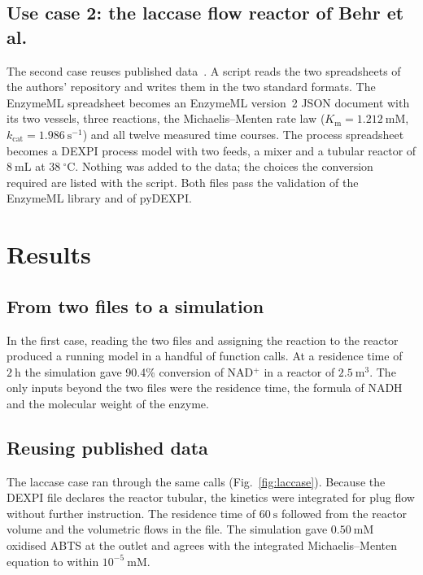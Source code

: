 \documentclass[preprint,12pt]{elsarticle}
\begin{document}
\subsection{Use case 2: the laccase flow reactor of Behr et al.}

The second case reuses published data~\cite{behr2024,behr2024data}. A
script reads the two spreadsheets of the authors' repository and writes
them in the two standard formats. The EnzymeML spreadsheet becomes an
EnzymeML version~2 JSON document with its two vessels, three reactions, the
Michaelis--Menten rate law ($K_\mathrm{m} = 1.212~\mathrm{mM}$,
$k_\mathrm{cat} = 1.986~\mathrm{s^{-1}}$) and all twelve measured time
courses. The process spreadsheet becomes a DEXPI process model with two
feeds, a mixer and a tubular reactor of $8~\mathrm{mL}$ at
$38~^{\circ}\mathrm{C}$. Nothing was added to the data; the choices the
conversion required are listed with the script. Both files pass the
validation of the EnzymeML library and of pyDEXPI.

\section{Results}

\subsection{From two files to a simulation}

In the first case, reading the two files and assigning the reaction to the
reactor produced a running model in a handful of function calls. At a
residence time of $2~\mathrm{h}$ the simulation gave 90.4\% conversion of
NAD$^+$ in a reactor of $2.5~\mathrm{m^3}$. The only inputs beyond the two
files were the residence time, the formula of NADH and the molecular
weight of the enzyme.

\subsection{Reusing published data}

The laccase case ran through the same calls (Fig.~\ref{fig:laccase}).
Because the DEXPI file declares the reactor tubular, the kinetics were
integrated for plug flow without further instruction. The residence time
of $60~\mathrm{s}$ followed from the reactor volume and the volumetric
flows in the file. The simulation gave $0.50~\mathrm{mM}$ oxidised ABTS at
the outlet and agrees with the integrated Michaelis--Menten equation to
within $10^{-5}~\mathrm{mM}$.
\end{document}
